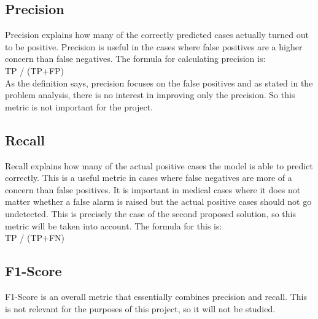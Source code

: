 \documentclass[11pt, a4paper]{article}
\begin{document}
\subsection{Precision}
Precision explains how many of the correctly predicted cases actually turned out to be positive. Precision is useful in the cases where false positives are a higher concern than false negatives. The formula for calculating precision is:\\
TP / (TP+FP)
\\
As the definition says, precision focuses on the false positives and as stated in the problem analysis, there is no interest in improving only the precision. So this metric is not important for the project.
\subsection{Recall}
Recall explains how many of the actual positive cases the model is able to predict correctly. This is a useful metric in cases where false negatives are more of a concern than false positives. It is important in medical cases where it does not matter whether a false alarm is raised but the actual positive cases should not go undetected. This is precisely the case of the second proposed solution, so this metric will be taken into account. The formula for this is:\\
TP / (TP+FN)
\subsection{F1-Score}
F1-Score is an overall metric that essentially combines precision and recall. This is not relevant for the purposes of this project, so it will not be studied.
\end{document}
